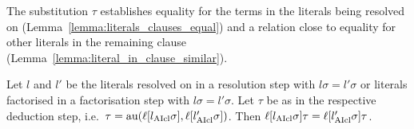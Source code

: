 \documentclass[,%
	paper=a4,%
	DIV12, %
	twoside=false,%
	liststotoc,
	bibtotoc,
	draft=false,%
	numbers=noendperiod
]{scrartcl}
\begin{document}
The substitution $\tau$ establishes equality for the terms in the literals being resolved on (Lemma~\ref{lemma:literals_clauses_equal}) and a relation close to equality for other literals in the remaining clause (Lemma~\ref{lemma:literal_in_clause_similar}).
\begin{lemma}
	\label{lemma:literals_clauses_equal}


	Let $l$ and $l'$ be the literals resolved on in a resolution step with $l\sigma = l'\sigma$ or literals factorised in a factorisation step with $l\sigma = l'\sigma$.
	Let $\tau$ be as in the respective deduction step, i.e.\ $\tau = \operatorname{au}(\ell[l_{\operatorname{AIcl}}\sigma], \ell[l_{\operatorname{AIcl}}'\sigma])$. Then $\ell[l_{\operatorname{AIcl}}\sigma]\tau = \ell[l_{\operatorname{AIcl}}'\sigma]\tau$.
\end{lemma}
\end{document}
